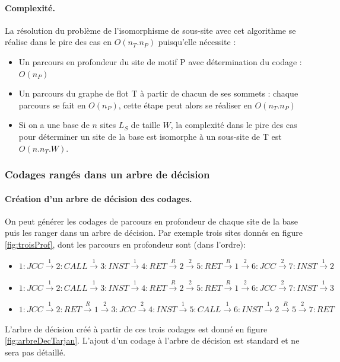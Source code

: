 \paragraph{Complexité.}
La résolution du problème de l'isomorphisme de sous-site avec cet algorithme se réalise dans le pire des cas en $O(n_T.n_P)$ puisqu'elle nécessite :
\begin{itemize}
 \item Un parcours en profondeur du site de motif P avec détermination du codage : $O(n_P)$
 \item Un parcours du graphe de flot T à partir de chacun de ses sommets : chaque parcours se fait en $O(n_P)$, cette étape peut alors se réaliser en $O(n_T.n_P)$
 \item Si on a une base de $n$ sites $L_S$ de taille $W$, la complexité dans le pire des cas pour déterminer un site de la base est isomorphe à un sous-site de T est $O(n.n_T.W)$.
\end{itemize}

\subsubsection{Codages rangés dans un arbre de décision}
\paragraph{Création d'un arbre de décision des codages.}
On peut générer les codages de parcours en profondeur de chaque site de la base puis les ranger dans un arbre de décision. Par exemple trois sites donnés en figure \ref{fig:troisProf}, dont les parcours en profondeur sont (dans l'ordre):
\begin{itemize}
 \item $1: JCC\xrightarrow{1} 2: CALL \xrightarrow{1} 3: INST \xrightarrow{1} 4: RET \xrightarrow{R} 2 \xrightarrow{2} 5: RET \xrightarrow{R} 1 \xrightarrow{2} 6: JCC \xrightarrow{2} 7:INST \xrightarrow{1} 2$
 \item $1: JCC\xrightarrow{1} 2: CALL \xrightarrow{1} 3: INST \xrightarrow{1} 4: RET \xrightarrow{R} 2 \xrightarrow{2} 5: RET \xrightarrow{R} 1 \xrightarrow{2} 6: JCC \xrightarrow{2} 7:INST \xrightarrow{1} 3$
 \item $1: JCC\xrightarrow{1} 2: RET \xrightarrow{R} 1 \xrightarrow{2} 3: JCC \xrightarrow{2} 4: INST \xrightarrow{1} 5: CALL \xrightarrow{1} 6: INST \xrightarrow{1} 2 \xrightarrow{R} 5 \xrightarrow{2} 7: RET$
\end{itemize}
L'arbre de décision créé à partir de ces trois codages est donné en figure \ref{fig:arbreDecTarjan}. L'ajout d'un codage à l'arbre de décision est standard et ne sera pas détaillé.

